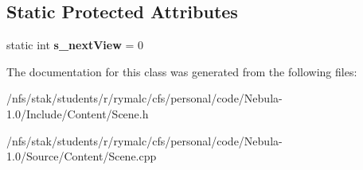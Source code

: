 \subsection*{Static Protected Attributes}
\begin{DoxyCompactItemize}
\item 
\hypertarget{classScene_a671fc279ea4705b955e8be97b5fbce68}{
static int {\bfseries s\_\-nextView} = 0}
\label{classScene_a671fc279ea4705b955e8be97b5fbce68}

\end{DoxyCompactItemize}


The documentation for this class was generated from the following files:\begin{DoxyCompactItemize}
\item 
/nfs/stak/students/r/rymalc/cfs/personal/code/Nebula-\/1.0/Include/Content/Scene.h\item 
/nfs/stak/students/r/rymalc/cfs/personal/code/Nebula-\/1.0/Source/Content/Scene.cpp\end{DoxyCompactItemize}

